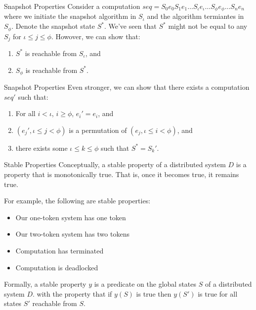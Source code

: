 \documentclass{beamer}
\begin{document}
\begin{frame}{Snapshot Properties}
  Consider a computation $seq = S_0 e_0 S_1 e_1 \ldots S_\iota e_\iota \ldots
  S_\phi e_\phi \ldots S_n e_n$ where we initiate the snapshot algorithm in
  $S_\iota$ and the algorithm termiantes in $S_\phi$. Denote the snapshot state
  $S^*$.  We've seen that $S^*$ might not be equal to any $S_j$ for $\iota \leq
  j \leq \phi$. Howover, we can show that:
  \begin{enumerate}
    \item $S^*$ is reachable from $S_\iota$, and
    \item $S_\phi$ is reachable from $S^*$.
  \end{enumerate}
\end{frame}

\begin{frame}{Snapshot Properties}
  Even stronger, we can show that there exists a computation $seq'$ such that:
  \begin{enumerate}
    \item For all $i < \iota$, $i \geq \phi$, $e_i' = e_i$, and
    \item $(e_j', \iota \leq j < \phi)$ is a permutation of $(e_j, \iota \leq i
      < \phi)$, and
    \item there exists some $\iota \leq k \leq \phi$ such that $S^* = S_k'$.
  \end{enumerate}
\end{frame}

\begin{frame}{Stable Properties}
  Conceptually, a stable property of a distributed system $D$ is a property
  that is monotonically true. That is, once it becomes true, it remains true.

  \pause

  For example, the following are stable properties:
  \begin{itemize}
    \item Our one-token system has one token
    \item Our two-token system has two tokens
    \item Computation has terminated
    \item Computation is deadlocked
  \end{itemize}

  \pause

  Formally, a stable property $y$ is a predicate on the global states $S$ of a
  distributed system $D$. with the property that if $y(S)$ is true then $y(S')$
  is true for all states $S'$ reachable from $S$.
\end{frame}
\end{document}
